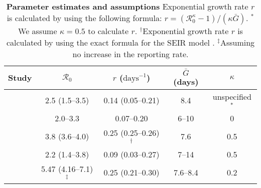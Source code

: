 \documentclass[12pt]{article}
\begin{document}
\begin{table}[!th]
\begin{center}
\begin{tabular}{l|c|c|c|c}
Study & $\mathcal R_0$ & $r$ ($\textrm{days}^{-1}$) & $\bar G$ (days) & $\kappa$ \\
\hline
\cite{imaincov} & 2.5 (1.5--3.5) & 0.14 (0.05--0.21) & 8.4 & unspecified$^\ast$ \\
\hline
\cite{majumderncov} & 2.0--3.3 & 0.07--0.20 & 6--10 & 0 \\
\hline
\cite{readncov} & 3.8 (3.6--4.0) & 0.25 (0.25--0.26)$^\dagger$ & 7.6 & 0.5 \\
\hline
\cite{riouncov} & 2.2 (1.4--3.8) & 0.09 (0.03--0.27) & 7--14 & 0.5\\
\hline
\cite{zhaoncov} & 5.47 (4.16--7.1)$^\ddagger$ & 0.25 (0.21--0.30) & 7.6--8.4 & 0.2
\end{tabular}
\end{center}
\caption{
\textbf{Parameter estimates and assumptions}
Exponential growth rate $r$ is calculated by using the following formula: $r = (\mathcal R_0^\kappa - 1)/(\kappa \bar{G})$.
$^\ast$We assume $\kappa = 0.5$ to calculate $r$.
$^\dagger$Exponential growth rate $r$ is calculated by using the exact formula for the SEIR model \citep{ma2014estimating}.
$^\ddagger$Assuming no increase in the reporting rate.
}
\end{table}





\end{document}
